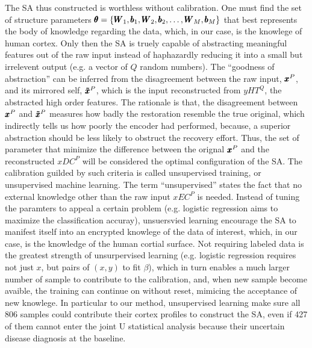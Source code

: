 The SA thus constructed is worthless without calibration. One must find the set of structure parameters $\pmb{\theta}=\{\pmb{W}_1, \pmb{b}_1, \pmb{W}_2, \pmb{b}_2, \dots, \pmb{W}_M, \pmb{b}_M\}$ that best represents the body of knowledge regarding the data, which, in our case, is the knowlege of human cortex. Only then the SA is truely capable of abstracting meaningful features out of the raw input instead of haphazardly reducing it into a small but irrelevent output (e.g. a vector of $Q$ random numbers). The ``goodness of abstraction'' can be inferred from the disagreement between the raw input, $\pmb{x}^P$, and its mirrored self, $\pmb{\tilde{x}}^P$, which is the input reconstructed from $yHT^Q$, the abstracted high order features. The rationale is that, the disagreement between $\pmb{x}^P$ and $\pmb{\tilde{x}}^P$ measures how badly the restoration resemble the true original, which indirectly tells us how poorly the encoder had performed, because, a superior abstraction should be less likely to obstruct the recovery effort. Thus, the set of parameter that minimize the difference between the orignal $\pmb{x}^P$ and the reconstructed $xDC^P$ will be considered the optimal configuration of the SA. The calibration guilded by such criteria is called unsupervised training, or unsupervised machine learning. The term ``unsupervised'' states the fact that no external knowledge other than the raw input $xEC^P$ is needed. Instead of tuning the paramters to appeal a certain problem (e.g. logistic regression aims to maximize the classification accuray), unsuersvied learning encourage the SA to manifest itself into an encrypted knowlege of the data of interest, which, in our case, is the knowledge of the human cortial surface. Not requiring labeled data is the greatest strength of unsurpervised learning (e.g. logistic regression requires not just $x$, but pairs of $(x,y)$ to fit $\beta$), which in turn enables a much larger number of sample to contribute to the calibration, and, when new sample become avaible, the training can continue on without reset, mimicing the acceptance of new knowlege. In particular to our method, unsupervised learning make sure all 806 samples could contribute their cortex profiles to construct the SA, even if 427 of them cannot enter the joint U statistical analysis because their uncertain disease diagnosis at the baseline.

